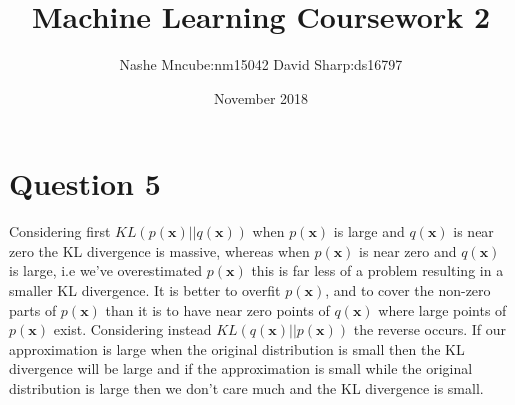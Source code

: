 \documentclass[10pt]{article}
\title{Machine Learning Coursework 2}
\author{Nashe Mncube:nm15042 David Sharp:ds16797}
\date{November 2018}
\begin{document}
    \maketitle

    \section{Question 5}
    Considering first $KL(p(\mathbf{x})||q(\mathbf{x}))$ when $p(\mathbf{x})$ is large and $q(\mathbf{x})$ is near zero
    the KL divergence is massive, whereas when $p(\mathbf{x})$ is near zero and $q(\mathbf{x})$ is large, i.e we've
    overestimated $p(\mathbf{x})$ this is far less of a problem resulting in a smaller KL divergence.
    It is better to overfit $p(\mathbf{x})$, and to cover the non-zero parts of $p(\mathbf{x})$ than it is
    to have near zero points of $q(\mathbf{x})$ where large points of $p(\mathbf{x})$ exist.
    Considering instead $KL(q(\mathbf{x})||p(\mathbf{x}))$ the reverse occurs. If our approximation is large when the
    original distribution is small then the KL divergence will be large and if the approximation is small while the
    original distribution is large then we don't care much and the KL divergence is small.









  
\end{document}
